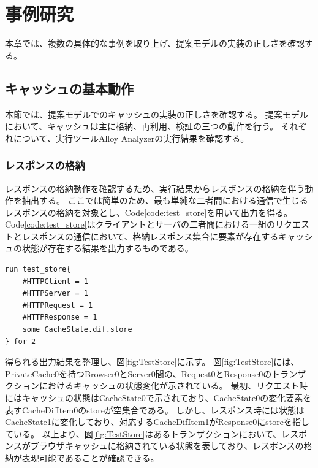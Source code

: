 \documentclass[12pt,a4paper]{jbook}
\begin{document}
\newpage

\chapter{事例研究}
本章では、複数の具体的な事例を取り上げ、提案モデルの実装の正しさを確認する。

\section{キャッシュの基本動作}
本節では、提案モデルでのキャッシュの実装の正しさを確認する。
提案モデルにおいて、キャッシュは主に格納、再利用、検証の三つの動作を行う。
それぞれについて、実行ツールAlloy Analyzerの実行結果を確認する。

\subsection{レスポンスの格納}
レスポンスの格納動作を確認するため、実行結果からレスポンスの格納を伴う動作を抽出する。
ここでは簡単のため、最も単純な二者間における通信で生じるレスポンスの格納を対象とし、Code\ref{code:test_store}を用いて出力を得る。
Code\ref{code:test_store}はクライアントとサーバの二者間における一組のリクエストとレスポンスの通信において、格納レスポンス集合に要素が存在するキャッシュの状態が存在する結果を出力するものである。

\begin{lstlisting}[caption=レスポンスの格納, label=code:test_store]
run test_store{
	#HTTPClient = 1
	#HTTPServer = 1
	#HTTPRequest = 1
	#HTTPResponse = 1
	some CacheState.dif.store
} for 2
\end{lstlisting}

得られる出力結果を整理し、図\ref{fig:TestStore}に示す。
図\ref{fig:TestStore}には、PrivateCache0を持つBrowser0とServer0間の、Request0とResponse0のトランザクションにおけるキャッシュの状態変化が示されている。
最初、リクエスト時にはキャッシュの状態はCacheState0で示されており、CacheState0の変化要素を表すCacheDifItem0のstoreが空集合である。
しかし、レスポンス時には状態はCacheState1に変化しており、対応するCacheDifItem1がResponse0にstoreを指している。
以上より、図\ref{fig:TestStore}はあるトランザクションにおいて、レスポンスがブラウザキャッシュに格納されている状態を表しており、レスポンスの格納が表現可能であることが確認できる。
\end{document}

